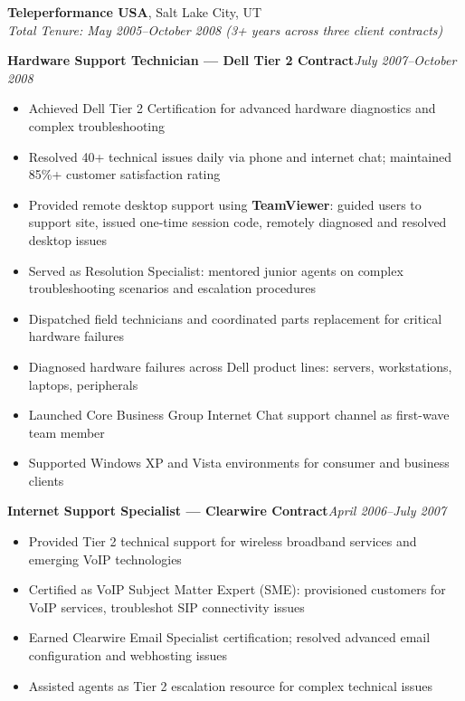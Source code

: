 \documentclass[9pt,letterpaper]{extarticle}
\begin{document}
\vspace{5pt}
\noindent\textbf{Teleperformance USA}, Salt Lake City, UT\\
\textit{Total Tenure: May 2005--October 2008 (3+ years across three client contracts)}

\smallskip
{}
\textbf{Hardware Support Technician --- Dell Tier 2 Contract}\hfill\textit{July 2007--October 2008}
\begin{itemize}
  \item Achieved Dell Tier 2 Certification for advanced hardware diagnostics and complex troubleshooting
  \item Resolved 40+ technical issues daily via phone and internet chat; maintained 85\%+ customer satisfaction rating
  \item Provided remote desktop support using \textbf{TeamViewer}: guided users to support site, issued one-time session code, remotely diagnosed and resolved desktop issues
  \item Served as Resolution Specialist: mentored junior agents on complex troubleshooting scenarios and escalation procedures
  \item Dispatched field technicians and coordinated parts replacement for critical hardware failures
  \item Diagnosed hardware failures across Dell product lines: servers, workstations, laptops, peripherals
  \item Launched Core Business Group Internet Chat support channel as first-wave team member
  \item Supported Windows XP and Vista environments for consumer and business clients
\end{itemize}

\textbf{Internet Support Specialist --- Clearwire Contract}\hfill\textit{April 2006--July 2007}
\begin{itemize}
  \item Provided Tier 2 technical support for wireless broadband services and emerging VoIP technologies
  \item Certified as VoIP Subject Matter Expert (SME): provisioned customers for VoIP services, troubleshot SIP connectivity issues
  \item Earned Clearwire Email Specialist certification; resolved advanced email configuration and webhosting issues
  \item Assisted agents as Tier 2 escalation resource for complex technical issues
\end{itemize}
\end{document}
